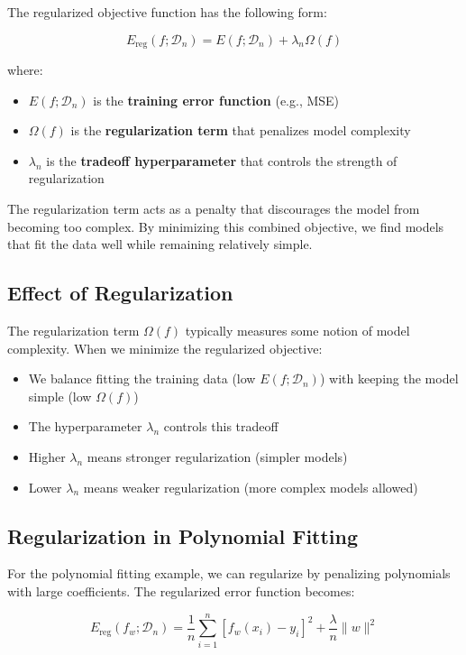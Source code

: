 \documentclass[11pt,a4paper]{article}
\theoremstyle{definition}
\theoremstyle{plain}
\theoremstyle{remark}
\begin{document}
The regularized objective function has the following form:

\[
E_{\text{reg}}(f; \mathcal{D}_n) = E(f; \mathcal{D}_n) + \lambda_n \Omega(f)
\]

where:
\begin{itemize}
    \item $E(f; \mathcal{D}_n)$ is the \textbf{training error function} (e.g., MSE)
    \item $\Omega(f)$ is the \textbf{regularization term} that penalizes model complexity
    \item $\lambda_n$ is the \textbf{tradeoff hyperparameter} that controls the strength of regularization
\end{itemize}

The regularization term acts as a penalty that discourages the model from becoming too complex. By minimizing this combined objective, we find models that fit the data well while remaining relatively simple.

\subsection{Effect of Regularization}

The regularization term $\Omega(f)$ typically measures some notion of model complexity. When we minimize the regularized objective:
\begin{itemize}
    \item We balance fitting the training data (low $E(f; \mathcal{D}_n)$) with keeping the model simple (low $\Omega(f)$)
    \item The hyperparameter $\lambda_n$ controls this tradeoff
    \item Higher $\lambda_n$ means stronger regularization (simpler models)
    \item Lower $\lambda_n$ means weaker regularization (more complex models allowed)
\end{itemize}

\subsection{Regularization in Polynomial Fitting}

For the polynomial fitting example, we can regularize by penalizing polynomials with large coefficients. The regularized error function becomes:

\[
E_{\text{reg}}(f_w; \mathcal{D}_n) = \frac{1}{n} \sum_{i=1}^{n} [f_w(x_i) - y_i]^2 + \frac{\lambda}{n} \|w\|^2
\]
\end{document}
